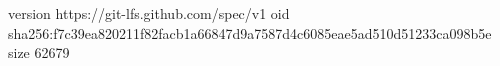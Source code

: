 version https://git-lfs.github.com/spec/v1
oid sha256:f7c39ea820211f82facb1a66847d9a7587d4c6085eae5ad510d51233ca098b5e
size 62679
